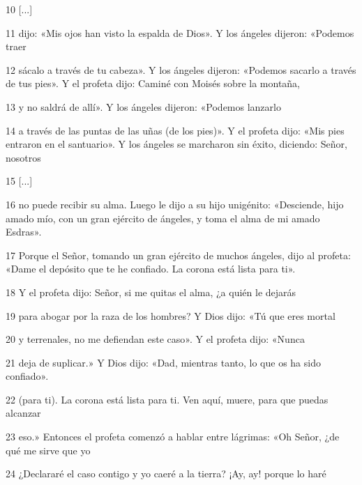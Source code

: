 \par 10 [...]

\par 11 dijo: «Mis ojos han visto la espalda de Dios». Y los ángeles dijeron: «Podemos traer

\par 12 sácalo a través de tu cabeza». Y los ángeles dijeron: «Podemos sacarlo a través de tus pies». Y el profeta dijo: Caminé con Moisés sobre la montaña,

\par 13 y no saldrá de allí». Y los ángeles dijeron: «Podemos lanzarlo

\par 14 a través de las puntas de las uñas (de los pies)». Y el profeta dijo: «Mis pies entraron en el santuario». Y los ángeles se marcharon sin éxito, diciendo: Señor, nosotros

\par 15 [...]

\par 16 no puede recibir su alma. Luego le dijo a su hijo unigénito: «Desciende, hijo amado mío, con un gran ejército de ángeles, y toma el alma de mi amado Esdras».

\par 17 Porque el Señor, tomando un gran ejército de muchos ángeles, dijo al profeta: «Dame el depósito que te he confiado. La corona está lista para ti».

\par 18 Y el profeta dijo: Señor, si me quitas el alma, ¿a quién le dejarás

\par 19 para abogar por la raza de los hombres? Y Dios dijo: «Tú que eres mortal

\par 20 y terrenales, no me defiendan este caso». Y el profeta dijo: «Nunca

\par 21 deja de suplicar.» Y Dios dijo: «Dad, mientras tanto, lo que os ha sido confiado».

\par 22 (para ti). La corona está lista para ti. Ven aquí, muere, para que puedas alcanzar

\par 23 eso.» Entonces el profeta comenzó a hablar entre lágrimas: «Oh Señor, ¿de qué me sirve que yo

\par 24 ¿Declararé el caso contigo y yo caeré a la tierra? ¡Ay, ay! porque lo haré

